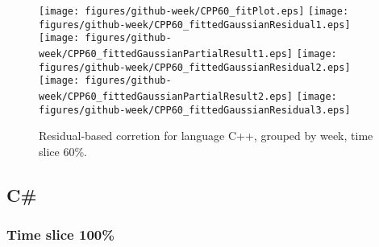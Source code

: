 \begin{figure}[t]
\centering
{}
{\texttt{[image: figures/github-week/CPP60\_fitPlot.eps]}}
{\texttt{[image: figures/github-week/CPP60\_fittedGaussianResidual1.eps]}}
{\texttt{[image: figures/github-week/CPP60\_fittedGaussianPartialResult1.eps]}}
{\texttt{[image: figures/github-week/CPP60\_fittedGaussianResidual2.eps]}}
{\texttt{[image: figures/github-week/CPP60\_fittedGaussianPartialResult2.eps]}}
{\texttt{[image: figures/github-week/CPP60\_fittedGaussianResidual3.eps]}}
\caption{Residual-based corretion for language C++, grouped by week, time slice 60\%.}
\end{figure}


\FloatBarrier


\subsection{C\#}

\subsubsection{Time slice 100\%}

